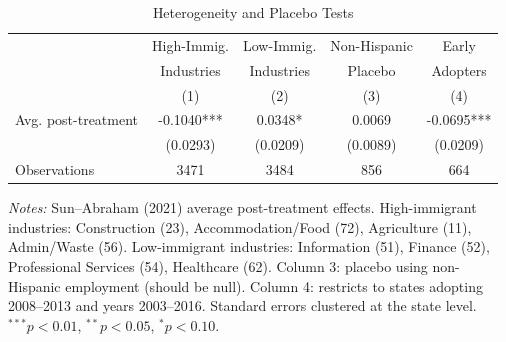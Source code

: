 \begin{table}[t]
\centering
\caption{Heterogeneity and Placebo Tests}
\label{tab:robust}
\begin{tabular}{lcccc}
\hline\hline
 & High-Immig. & Low-Immig. & Non-Hispanic & Early \\
 & Industries & Industries & Placebo & Adopters \\
 & (1) & (2) & (3) & (4) \\
\hline
Avg. post-treatment & -0.1040*** & 0.0348* & 0.0069 & -0.0695*** \\
 & (0.0293) & (0.0209) & (0.0089) & (0.0209) \\[6pt]
Observations & 3471 & 3484 & 856 & 664 \\
\hline\hline
\end{tabular}
\begin{tablenotes}
\small
\item \textit{Notes:} Sun--Abraham (2021) average post-treatment effects. High-immigrant industries: Construction (23), Accommodation/Food (72), Agriculture (11), Admin/Waste (56). Low-immigrant industries: Information (51), Finance (52), Professional Services (54), Healthcare (62). Column 3: placebo using non-Hispanic employment (should be null). Column 4: restricts to states adopting 2008--2013 and years 2003--2016. Standard errors clustered at the state level. $^{***}p<0.01$, $^{**}p<0.05$, $^{*}p<0.10$.
\end{tablenotes}
\end{table}

